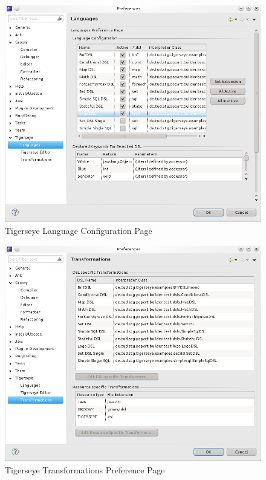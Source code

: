 \documentclass[article,colorback,accentcolor=tud4c]{tudreport}
\begin{document}
	\begin{figure}
	  \centering
	  \includegraphics[scale=.5,keepaspectratio=true]{./pics/preferences_languages.png}
	  \caption{Tigerseye Language Configuration Page}
	  \label{fig:prefs_languages}
	\end{figure}

	\begin{figure}
	  \centering
	  \includegraphics[scale=.5,keepaspectratio=true]{./pics/preferences_transformations.png}
	  \caption{Tigerseye Transformations Preference Page}
	  \label{fig:prefs_transformations}
	\end{figure}
\end{document}
